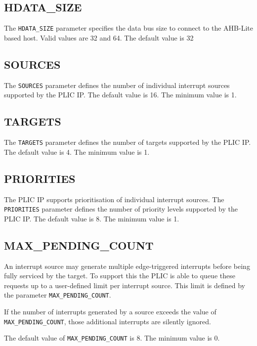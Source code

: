 \subsection{HDATA\_SIZE}

The \texttt{HDATA\_SIZE} parameter specifies the data bus size to
connect to the AHB-Lite based host. Valid values are 32 and 64. The
default value is 32

\hypertarget{SOURCES}{\subsection{SOURCES}\label{sec:SOURCES}}

The \texttt{SOURCES} parameter defines the number of individual
interrupt sources supported by the PLIC IP. The default value is 16. The
minimum value is 1.

\hypertarget{TARGETS}{\subsection{TARGETS}\label{sec:TARGETS}}

The \texttt{TARGETS} parameter defines the number of targets supported
by the PLIC IP. The default value is 4. The minimum value is 1.

\subsection{PRIORITIES}

The PLIC IP supports prioritisation of individual interrupt sources. The \texttt{PRIORITIES} parameter defines the number of priority levels supported by the PLIC IP. The default value is 8. The minimum value is 1.

\subsection{MAX\_PENDING\_COUNT}

An interrupt source may generate multiple edge-triggered interrupts before being fully serviced by the target. To support this the PLIC is able to queue these requests up to a user-defined limit per interrupt source. This limit is defined by the parameter \texttt{MAX\_PENDING\_COUNT}.

If the number of interrupts generated by a source exceeds the value of \texttt{MAX\_PENDING\_COUNT}, those additional interrupts are silently ignored.

The default value of \texttt{MAX\_PENDING\_COUNT} is 8. The minimum value is 0.

